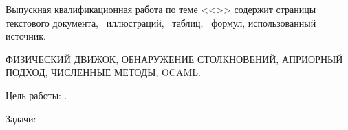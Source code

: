
Выпускная квалификационная работа по теме <<\Topic>> содержит
\pageref{LastPage} страницы текстового документа, %
\totalfigures~иллюстраций,
\totaltables~таблиц,
\totalequations~формул,
 использованный источник.

\MakeUppercase{
    физический движок,
    обнаружение столкновений,
    априорный подход,
    численные методы,
    OCaml.
}

Цель работы: \Target.

Задачи:

\Tasks
